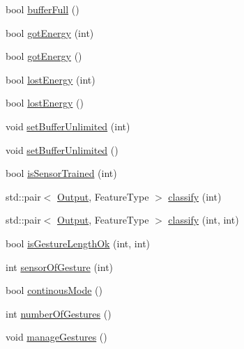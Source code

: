 \begin{DoxyCompactItemize}
bool \hyperlink{classGestureManagement_a36208ebdd11b74bb7cd4a15cab22af48}{bufferFull} ()
\item 
bool \hyperlink{classGestureManagement_a7a3d84bf9ff0ac8f04ccf28603f49130}{gotEnergy} (int)
\item 
bool \hyperlink{classGestureManagement_a792bf83b1fe0b7cd3adee6a1ad967683}{gotEnergy} ()
\item 
bool \hyperlink{classGestureManagement_a770a0f62af7a5b74e2e942be7234a76c}{lostEnergy} (int)
\item 
bool \hyperlink{classGestureManagement_ad934138db81f43f1af34cacd6e080b01}{lostEnergy} ()
\item 
void \hyperlink{classGestureManagement_a3921a36bd1df37564eeae05f3b481b6b}{setBufferUnlimited} (int)
\item 
void \hyperlink{classGestureManagement_af9bbed6b1b9f4dca4923abbe86aab41b}{setBufferUnlimited} ()
\item 
bool \hyperlink{classGestureManagement_aafb7ac8ecc9567078fb3e4d76ff75f63}{isSensorTrained} (int)
\item 
std::pair$<$ \hyperlink{structOutput}{Output}, FeatureType $>$ \hyperlink{classGestureManagement_a3a2a232f68bcd55aa546df2df8c2faf4}{classify} (int)
\item 
std::pair$<$ \hyperlink{structOutput}{Output}, FeatureType $>$ \hyperlink{classGestureManagement_a640061cf24cb6663bb6a9660cb53ad18}{classify} (int, int)
\item 
bool \hyperlink{classGestureManagement_a4c11724fd1e387800056963e2318b70d}{isGestureLengthOk} (int, int)
\item 
int \hyperlink{classGestureManagement_a820208c72d103acd4a7712e83fb89ef0}{sensorOfGesture} (int)
\item 
bool \hyperlink{classGestureManagement_ac1cb3b54aca326d1f38d856b10c41d36}{continousMode} ()
\item 
int \hyperlink{classGestureManagement_aa389aa00c2f8f0bffcfb2765fda8b5dd}{numberOfGestures} ()
\item 
void \hyperlink{classGestureManagement_a8bc4dbaaf02e90d32624eb756ab4d712}{manageGestures} ()
\end{DoxyCompactItemize}


